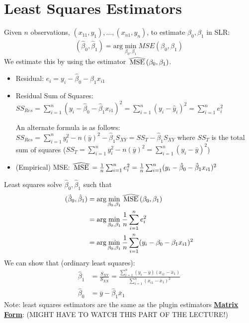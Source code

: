 \documentclass{article}
\newcommand{\argmin}{\text{arg}\min}
\newcommand{\xbar}{\overline{x}}
\newcommand{\ybar}{\overline{y}}
\newcommand{\sumiton}{\sum_{i=1}^n}
\newcommand{\betahat}{\hat{\beta}}
\newcommand\reallywidehat[1]{%
\savestack{\tmpbox}{\stretchto{%
  \scaleto{%
    \scalerel*[\widthof{\ensuremath{#1}}]{\kern-.6pt\bigwedge\kern-.6pt}%
    {\rule[-\textheight/2]{1ex}{\textheight}}%
  }{\textheight}%
}{0.5ex}}%
\stackon[1pt]{#1}{\tmpbox}%
}
\begin{document}
\section{Least Squares Estimators}
Given $n$ observations, $(x_{11},y_1), \ldots, (x_{n1},y_n)$, to estimate $\beta_0,\beta_1$ in SLR:
\begin{align}
    (\hat{\beta}_0,\hat{\beta}_1) = \argmin_{\beta_0,\beta_1} MSE(\beta_0, \beta_1)
\end{align}
We estimate this by using the estimator $\reallywidehat{MSE}(\beta_0, \beta_1)$.
\begin{itemize}
    \item Residual: $e_i = y_i - \hat{\beta}_0 - \hat{\beta}_1x_{i1}$
    \item Residual Sum of Squares: $SS_{Res} = \sumiton (y_i - \hat{\beta}_0 - \hat{\beta}_1x_{i1})^2 = \sumiton (y_i - \hat{y}_i)^2 = \sumiton e_i^2$
    
    An alternate formula is as follows: $SS_{Res} = \sumiton y_i^2 - n(\ybar)^2 - \betahat_1S_{XY} = SS_T - \betahat_1S_{XY}$ where $SS_T$ is the total sum of squares ($SS_T = \sumiton y_i^2 - n(\ybar)^2 = \sumiton (y_i - \ybar)^2$)
    \item (Empirical) MSE: $\reallywidehat{MSE} = \frac{1}{n}\sumiton e_i^2 = \frac{1}{n}\sumiton(y_i - \hat{\beta}_0 - \hat{\beta}_1x_{i1})^2$
\end{itemize}
Least squares solve $\hat{\beta}_0,\hat{\beta}_1$ such that
\begin{align}
    (\hat{\beta}_0,\hat{\beta}_1) &= \argmin_{\beta_0,\beta_1} \reallywidehat{MSE}(\beta_0, \beta_1)\\
    &= \argmin_{\beta_0,\beta_1}\frac{1}{n}\sumiton e_i^2\\
    &= \argmin_{\beta_0,\beta_1} \frac{1}{n}\sumiton(y_i - \beta_0 - \beta_1x_{i1})^2
\end{align}
We can show that (ordinary least squares):
\begin{align}
    \hat{\beta}_1 &= \frac{S_{XY}}{S_{XX}} = \frac{\sumiton(y_i- \ybar)(x_{i1} - \xbar_1)}{\sumiton (x_{i1} - \xbar_1)^2}\\
    \hat{\beta}_0 &= \ybar - \hat{\beta}_1\xbar_1
\end{align}
Note: least squares estimators are the same as the plugin estimators
\bigbreak\noindent
\textbf{\underline{Matrix Form}}:
(MIGHT HAVE TO WATCH THIS PART OF THE LECTURE!)
\end{document}
